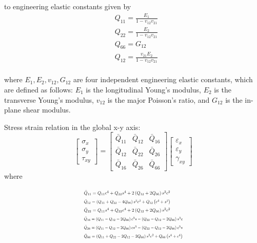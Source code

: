 \documentclass[USenglish,twocolumn]{article}
\begin{document}
to engineering elastic constants given by
\begin{equation}
    \begin{split}
    &Q_{11}=\frac{E_1}{1-v_{12}v_{21}}\\
    &Q_{22}=\frac{E_2}{1-v_{12}v_{21}}\\
    &Q_{66}=G_{12}\\
    &Q_{12}=\frac{v_{21}E_2}{1-v_{12}v_{21}}\\
    \end{split}
\end{equation}

where $E_1, E_2, v_{12}, G_{12} $ are four independent engineering elastic constants, which are defined as follows: $E_1 $ is the longitudinal Young's modulus, $E_2 $ is the transverse Young's modulus, $v_{12} $ is the major Poisson's ratio, and $G_{12} $ is the in-plane shear modulus.

Stress strain relation in the global x-y axis:
\begin{equation}\left[\begin{array}{l}\sigma _{x} \\ \sigma _{y} \\ \tau_{xy}\end{array}\right]=\left[\begin{array}{lll}\bar{Q}_{11} & \bar{Q}_{12} & \bar{Q}_{16}\\ \bar{Q}_{12} & \bar{Q}_{22} & \bar{Q}_{26} \\ \bar{Q}_{16} & \bar{Q}_{26} &\bar{Q}_{66}\end{array}\right]\left[\begin{array}{l}\varepsilon_{x} \\ \varepsilon_{y}\\ \gamma_{x y}\end{array}\right]
\end{equation}
where

\begin{equation}
	\begin{array}{l}
		\resizebox{.35\textwidth}{!}{$\bar{Q}_{11}=Q_{11} c^{4}+Q_{22} s^{4}+2\left(Q_{12}+2
		Q_{66}\right) s^{2} c^{2}$} \\

		\resizebox{.35\textwidth}{!}{$\bar{Q}_{12}=\left(Q_{11}+Q_{22}-4 Q_{66}\right) s^{2}
		c^{2}+Q_{12}\left(c^{4}+s^{2}\right)$} \\

		\resizebox{.35\textwidth}{!}{$\bar{Q}_{22}=Q_{11} s^{4}+Q_{22} c^{4}+2\left(Q_{12}+2
		Q_{66}\right) s^{2} c^{2}$} \\

		\resizebox{.4\textwidth}{!}{$\bar{Q}_{16}=\left(Q_{11}-Q_{12}-2 Q_{66}\right) c^{3} s-\left(Q_{22}-Q_{12}-2Q_{66}\right) s^{3} c$}
		 \\ 
		\resizebox{.4\textwidth}{!}{$\bar{Q}_{26}=\left(Q_{11}-Q_{12}-2 Q_{66}\right) c s^{3}-\left(Q_{22}-Q_{12}-2 Q_{66}\right)c^{3} s$}
		 \\ 
	\resizebox{.4\textwidth}{!}	{$\bar{Q}_{66}=\left(Q_{11}+Q_{22}-2 Q_{12}-2 Q_{66}\right)
	s^{2}c^{2}+Q_{66}\left(s^{4}+c^{4}\right)$}\\
	\end{array}
\end{equation}
\end{document}
